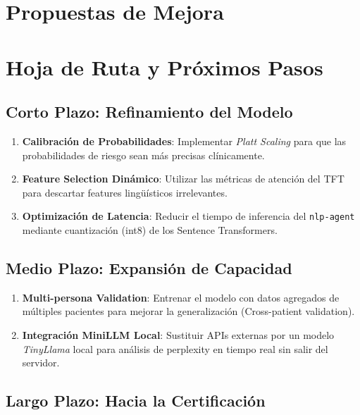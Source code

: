 \documentclass[11pt,a4paper]{article}
\begin{document}
\section{Propuestas de Mejora}

\section{Hoja de Ruta y Próximos Pasos}

\subsection{Corto Plazo: Refinamiento del Modelo}

\begin{enumerate}
    \item \textbf{Calibración de Probabilidades}: Implementar \textit{Platt Scaling} para que las probabilidades de riesgo sean más precisas clínicamente.
    
    \item \textbf{Feature Selection Dinámico}: Utilizar las métricas de atención del TFT para descartar features lingüísticos irrelevantes.
    
    \item \textbf{Optimización de Latencia}: Reducir el tiempo de inferencia del \texttt{nlp-agent} mediante cuantización (int8) de los Sentence Transformers.
\end{enumerate}

\subsection{Medio Plazo: Expansión de Capacidad}

\begin{enumerate}
    \item \textbf{Multi-persona Validation}: Entrenar el modelo con datos agregados de múltiples pacientes para mejorar la generalización (Cross-patient validation).
    
    \item \textbf{Integración MiniLLM Local}: Sustituir APIs externas por un modelo \textit{TinyLlama} local para análisis de perplexity en tiempo real sin salir del servidor.
\end{enumerate}

\subsection{Largo Plazo: Hacia la Certificación}
\end{document}

